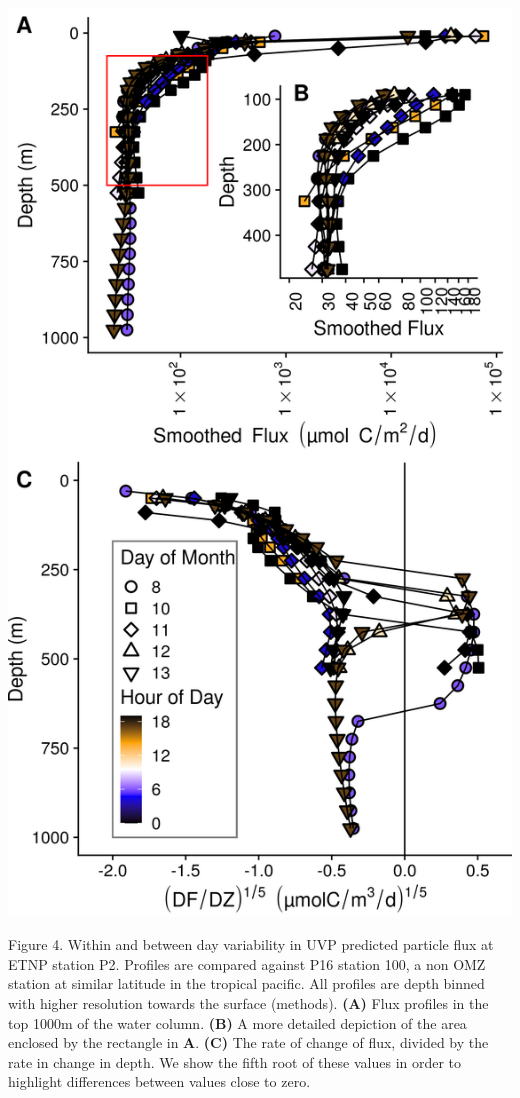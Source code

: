 \documentclass[]{article}
\begin{document}
\includegraphics{../figures/FluxDeepDive.png}

Figure 4. Within and between day variability in UVP predicted particle
flux at ETNP station P2. Profiles are compared against P16 station 100,
a non OMZ station at similar latitude in the tropical pacific. All
profiles are depth binned with higher resolution towards the surface
(methods). \textbf{(A)} Flux profiles in the top 1000m of the water
column. \textbf{(B)} A more detailed depiction of the area enclosed by
the rectangle in \textbf{A}. \textbf{(C)} The rate of change of flux,
divided by the rate in change in depth. We show the fifth root of these
values in order to highlight differences between values close to zero.
\end{document}
